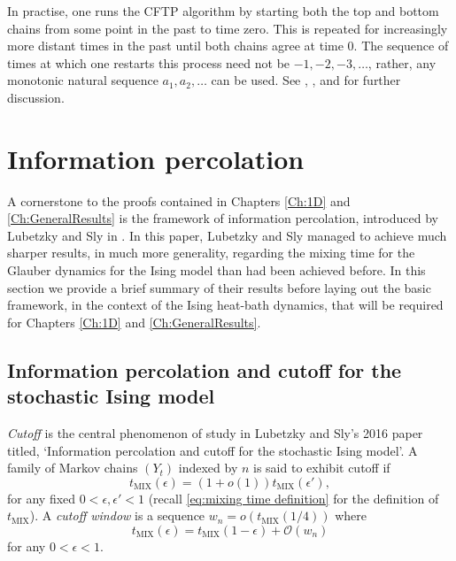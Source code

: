 	In practise, one runs the CFTP algorithm by starting both the top and bottom chains from some point in the past to time zero. This is repeated for increasingly more distant times in the past until both chains agree at time 0. The sequence of times at which one restarts this process need not be $-1, -2, -3, \dots$, rather, any monotonic natural sequence $a_1, a_2,\dots$ can  be used. See \cite{Levin2009-fo}, \cite{Haggstrom2002-os}, and \cite{Jerrum1998-ph} for further discussion.

	
\section{Information percolation}
\label{sec:information percolation}
	A cornerstone to the proofs contained in Chapters \ref{Ch:1D} and \ref{Ch:GeneralResults} is the framework of information percolation, introduced by Lubetzky and Sly in \cite{Lubetzky2016-wd}. In this paper, Lubetzky and Sly managed to achieve much sharper results, in much more generality, regarding the mixing time for the Glauber dynamics for the Ising model than had been achieved before. In this section we provide a brief summary of their results before laying out the basic framework, in the context of the Ising heat-bath dynamics, that will be required for Chapters \ref{Ch:1D} and \ref{Ch:GeneralResults}.

	\subsection{Information percolation and cutoff for the stochastic Ising model}
	\emph{Cutoff} is the central phenomenon of study in Lubetzky and Sly's 2016 paper titled, `Information percolation and cutoff for the stochastic Ising model'.
	A family of Markov chains $(Y_t)$ indexed by $n$ is said to exhibit cutoff if
	\begin{equation}
		t_\mathrm{MIX}(\epsilon) = (1 + o(1)) t_\mathrm{MIX}(\epsilon'),
	\end{equation}
	for any fixed $0 < \epsilon, \epsilon' < 1$ (recall \eqref{eq:mixing time definition} for the definition of $t_\mathrm{MIX}$). A \emph{cutoff window} is a sequence $w_n = o(t_\mathrm{MIX}(1/4))$ where
	\begin{equation}
		t_\mathrm{MIX}(\epsilon) = t_\mathrm{MIX}(1 - \epsilon) + \mathcal{O}(w_n)
	\end{equation}
	for any $0 < \epsilon <1$.

